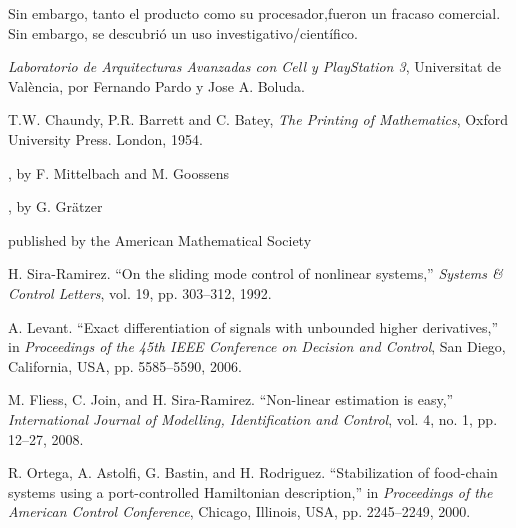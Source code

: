 \documentclass[12pt,compsoc]{IEEEtran}
\begin{document}
	Sin embargo, tanto el producto como su procesador,fueron un fracaso comercial. Sin embargo, se descubrió un uso investigativo/científico.
	
	
		\begin{thebibliography}{1}
			
			{\it{Laboratorio de Arquitecturas Avanzadas con Cell y PlayStation 3}}, Universitat de València, por Fernando Pardo y Jose A. Boluda.
			
			T.W. Chaundy, P.R. Barrett and C. Batey, {\it{The Printing of Mathematics}}, Oxford University Press. London, 1954.
			
			, by F. Mittelbach and M. Goossens
			
			, by G. Gr\"atzer
			
			 published by the American Mathematical Society
			
			H. Sira-Ramirez. ``On the sliding mode control of nonlinear systems,'' \textit{Systems \& Control Letters}, vol. 19, pp. 303--312, 1992.
			
			A. Levant. ``Exact differentiation of signals with unbounded higher derivatives,''  in \textit{Proceedings of the 45th IEEE Conference on Decision and Control}, San Diego, California, USA, pp. 5585--5590, 2006.
			
			M. Fliess, C. Join, and H. Sira-Ramirez. ``Non-linear estimation is easy,'' \textit{International Journal of Modelling, Identification and Control}, vol. 4, no. 1, pp. 12--27, 2008.
			
			R. Ortega, A. Astolfi, G. Bastin, and H. Rodriguez. ``Stabilization of food-chain systems using a port-controlled Hamiltonian description,'' in \textit{Proceedings of the American Control Conference}, Chicago, Illinois, USA, pp. 2245--2249, 2000.
			
		\end{thebibliography}
	
		
\end{document}
